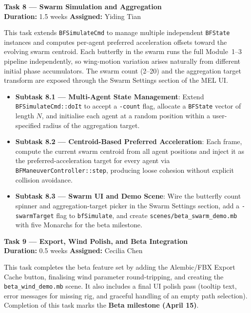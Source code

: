 \documentclass[12pt]{article}
\begin{document}
\bigskip
\noindent\textbf{Task 8 --- Swarm Simulation and Aggregation}\\
\textbf{Duration:} 1.5 weeks \quad \textbf{Assigned:} Yiding Tian

This task extends \texttt{BFSimulateCmd} to manage multiple independent
\texttt{BFState} instances and computes per-agent preferred acceleration offsets
toward the evolving swarm centroid. Each butterfly in the swarm runs the full
Module~1--3 pipeline independently, so wing-motion variation arises naturally from
different initial phase accumulators. The swarm count (2--20) and the aggregation
target transform are exposed through the Swarm Settings section of the MEL UI.

\begin{itemize}
  \item \textbf{Subtask 8.1 --- Multi-Agent State Management}: Extend
    \texttt{BFSimulateCmd::doIt} to accept a \texttt{-count} flag, allocate a
    \texttt{BFState} vector of length $N$, and initialise each agent at a random
    position within a user-specified radius of the aggregation target.
  \item \textbf{Subtask 8.2 --- Centroid-Based Preferred Acceleration}: Each frame,
    compute the current swarm centroid from all agent positions and inject it as the
    preferred-acceleration target for every agent via
    \texttt{BFManeuverController::step}, producing loose cohesion without explicit
    collision avoidance.
  \item \textbf{Subtask 8.3 --- Swarm UI and Demo Scene}: Wire the butterfly count
    spinner and aggregation-target picker in the Swarm Settings section, add a
    \texttt{-swarmTarget} flag to \texttt{bfSimulate}, and create
    \texttt{scenes/beta\_swarm\_demo.mb} with five Monarchs for the beta milestone.
\end{itemize}

\bigskip
\noindent\textbf{Task 9 --- Export, Wind Polish, and Beta Integration}\\
\textbf{Duration:} 0.5 weeks \quad \textbf{Assigned:} Cecilia Chen

This task completes the beta feature set by adding the Alembic/FBX Export Cache
button, finalising wind parameter round-tripping, and creating the
\texttt{beta\_wind\_demo.mb} scene. It also includes a final UI polish pass
(tooltip text, error messages for missing rig, and graceful handling of an empty
path selection). Completion of this task marks the \textbf{Beta milestone
(April 15)}.
\end{document}
